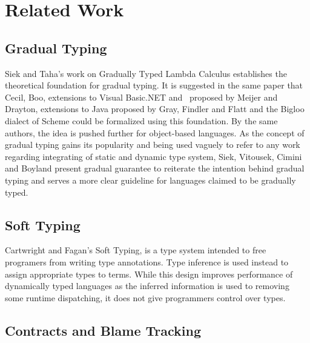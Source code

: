 \section{Related Work}

\subsection{Gradual Typing}
Siek and Taha's work on Gradually Typed Lambda Calculus\cite{siek2006gradual}
establishes the theoretical foundation for gradual typing.
It is suggested in the same paper that Cecil\cite{chambers2004cecil}, Boo\cite{de2005boo},
extensions to Visual Basic.NET and \csharp\ proposed by Meijer and Drayton\cite{meijer2004static},
extensions to Java proposed by Gray, Findler and Flatt\cite{gray2005fine}
and the Bigloo \cite{bres2004compiling,serrano2002bigloo} dialect of Scheme\cite{abelson1998revised}
could be formalized using this foundation.
By the same authors,
the idea is pushed further for object-based languages\cite{siek2007gradual}.
As the concept of gradual typing gains its popularity and being used vaguely to
refer to any work regarding integrating of static and dynamic type system,
Siek, Vitousek, Cimini and Boyland present gradual guarantee\cite{siek2015refined}
to reiterate the intention behind gradual typing and serves a more clear guideline for
languages claimed to be gradually typed.

\subsection{Soft Typing}
Cartwright and Fagan's Soft Typing\cite{cartwright1991soft},
is a type system intended to free programers from writing type annotations.
Type inference is used instead to assign appropriate types to terms.
While this design improves performance of dynamically typed languages
as the inferred information is used to removing some runtime dispatching,
it does not give programmers control over types.

\subsection{Contracts and Blame Tracking}


